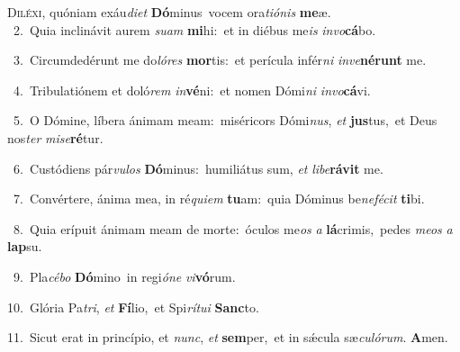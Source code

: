 \lettrine{\initial\textcolor{\initialcolor}{D}}{iléxi,} quóniam exáu\-\textit{di}\-\textit{et} \textbf{Dó}\-minus~\star vocem ora\-\textit{ti}\-\textit{ó}\textit{nis} \textbf{me}\-æ.\\
{\numbfont\textcolor{\numbcolor}{~2.}}~Quia inclinávit aurem \textit{su}\-\textit{am} \textbf{mi}\-hi:~\star et in diébus me\textit{is} \textit{in}\-\textit{vo}\textbf{cá}bo.\par
{\numbfont\textcolor{\numbcolor}{~3.}}~Circumdedérunt me do\-\textit{ló}\-\textit{res} \textbf{mor}\-tis:~\star et perícula infér\textit{ni} \textit{in}\-\textit{ve}\textbf{né}\textbf{runt} me.\par
{\numbfont\textcolor{\numbcolor}{~4.}}~Tribulatiónem et doló\textit{rem} \textit{in}\-\textbf{vé}ni:~\star et nomen Dómi\textit{ni} \textit{in}\-\textit{vo}\textbf{cá}vi.\par
{\numbfont\textcolor{\numbcolor}{~5.}}~O Dómine, líbera ánimam meam:~\dagger miséricors Dómi\-\textit{nus}\-, \textit{et} \textbf{jus}\-tus,~\star et Deus nos\textit{ter} \textit{mi}\-\textit{se}\textbf{ré}tur.\par
{\numbfont\textcolor{\numbcolor}{~6.}}~Custódiens pár\-\textit{vu}\-\textit{los} \textbf{Dó}\-minus:~\star humiliátus sum, \textit{et} \textit{li}\-\textit{be}\textbf{rá}\textbf{vit} me.\par
{\numbfont\textcolor{\numbcolor}{~7.}}~Convértere, ánima mea, in ré\-\textit{qui}\-\textit{em} \textbf{tu}\-am:~\star quia Dóminus be\-\textit{ne}\-\textit{fé}\textit{cit} \textbf{ti}\-bi.\par
{\numbfont\textcolor{\numbcolor}{~8.}}~Quia erípuit ánimam meam de morte:~\dagger óculos me\textit{os} \textit{a} \textbf{lá}\-crimis,~\star pedes \textit{me}\-\textit{os} \textit{a} \textbf{lap}\-su.\par
{\numbfont\textcolor{\numbcolor}{~9.}}~Pla\-\textit{cé}\-\textit{bo} \textbf{Dó}\-mino~\star in regi\-\textit{ó}\-\textit{ne} \textit{vi}\-\textbf{vó}rum.\par
{\numbfont\textcolor{\numbcolor}{10.}}~Glória Pa\-\textit{tri}\-, \textit{et} \textbf{Fí}\-lio,~\star et Spi\-\textit{rí}\-\textit{tu}\textit{i} \textbf{Sanc}\-to.\par
{\numbfont\textcolor{\numbcolor}{11.}}~Sicut erat in princípio, et \textit{nunc}\-, \textit{et} \textbf{sem}\-per,~\star et in sǽcula sæ\-\textit{cu}\-\textit{ló}\textit{rum}. \textbf{A}\-men.\par
